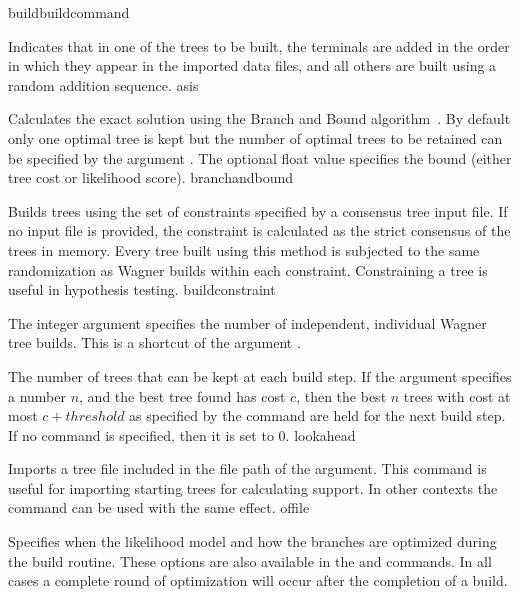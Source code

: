 \begin{command}{build}{buildcommand}
\begin{arguments}
{Indicates that in one of the trees to be built, the terminals are
added in the order in which they appear in the imported data files,
and all others are built using a random addition sequence.}
{asis}

{Calculates the exact solution using the Branch and Bound 
algorithm~\cite{hendy1982}. By default only one optimal tree is kept but
the number of optimal trees to be retained can be specified by the
argument . The optional float value specifies the
bound (either tree cost or likelihood score).}
{branchandbound} 

{Builds trees using the set of constraints specified by a consensus
tree input file. If no input file is provided, the constraint is
calculated as the strict consensus of the trees in memory. Every
tree built using this method is subjected to the same randomization
as Wagner builds within each constraint. Constraining a tree is
useful in hypothesis testing.} {buildconstraint}

{The integer argument specifies the number of independent, individual
Wagner tree builds. This is a shortcut of the argument .}
{}

{The number of trees that can be kept at each build step. If the
 argument specifies a number $n$, and the
best tree found has cost $c$, then the best $n$ trees with cost at
most $c + threshold$ as specified by the
 command are held for the next
build step. If no  command is specified,
then it is set to $0$.} {lookahead}

{Imports a tree file included in the file path of the argument.
This command is useful for importing starting trees for calculating
 support. In other contexts the command 
can be used with the same effect.} {offile}

{Specifies when the likelihood model and how the branches are
optimized during the build routine. These options are also available
in the  and  commands. In all
cases a complete round of optimization will occur after the completion
of a build.

}
\end{arguments}
\end{command}
